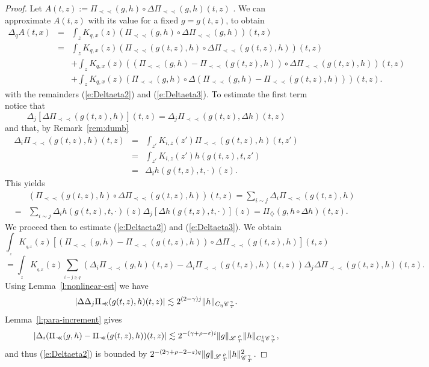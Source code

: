 \documentclass{amsart}
\newcommand{\assign}{:=}
\newcommand{\cdummy}{\cdot}
\newcommand{\precprec}{\prec\!\!\!\prec}
\theoremstyle{remark}
\theoremstyle{definition}
\newcommand{\CC}{\mathscr{C} \hspace{.1em}}
\newcommand{\LL}{\mathscr{L} \hspace{.2em}}
\begin{document}
\begin{proof}
  Let $A (t, z) \assign \Pi_{\precprec} (g, h) \circ \Delta \Pi_{\precprec}
  (g, h) (t, z)$ . We can approximate $A (t, z)$ with its value for a fixed $g
  = g (t, z)$, to obtain
  \begin{eqnarray}
    \Delta_q A (t, x) & = & \int_z K_{q, x} (z) (\Pi_{\precprec} (g, h) \circ
    \Delta \Pi_{\precprec} (g, h)) (t, z) \nonumber\\
    & = & \int_z K_{q, x} (z) (\Pi_{\precprec} (g (t, z), h) \circ \Delta
    \Pi_{\precprec} (g (t, z), h)) (t, z) \nonumber\\
    &  & + \int_z K_{q, x} (z) ((\Pi_{\precprec} (g, h) - \Pi_{\precprec} (g
    (t, z), h)) \circ \Delta \Pi_{\precprec} (g (t, z), h)) (t, z) 
    \label{e:Deltaeta2}\\
    &  & + \int_z K_{q, x} (z) (\Pi_{\precprec} (g, h) \circ \Delta
    (\Pi_{\precprec} (g, h) - \Pi_{\precprec} (g (t, z), h))) (t, z) . 
    \label{e:Deltaeta3}
  \end{eqnarray}
  with the remainders (\ref{e:Deltaeta2}) and (\ref{e:Deltaeta3}). To estimate
  the first term notice that
  \[ \Delta_j [\Delta \Pi_{\precprec} (g (t, z), h)] (t, z) = \Delta_j
     \Pi_{\precprec} (g (t, z), \Delta h) (t, z) \]
  and that, by Remark~\ref{rem:dumb}
  \begin{eqnarray*}
    \Delta_i \Pi_{\precprec} (g (t, z), h) (t, z) & = & \int_{z'} K_{i, z}
    (z') \Pi_{\precprec} (g (t, z), h) (t, z')\\
    & = & \int_{z'} K_{i, z} (z') h (g (t, z), t, z')\\
    & = & \Delta_i h (g (t, z), t, \cdummy) (z) .
  \end{eqnarray*}
  This yields
  \begin{eqnarray*}
    &  & (\Pi_{\precprec} (g (t, z), h) \circ \Delta \Pi_{\precprec} (g (t,
    z), h)) (t, z) = \sum_{i \sim j} \Delta_i \Pi_{\precprec} (g (t, z), h)\\
    & = & \sum_{i \sim j} \Delta_i h (g (t, z), t, \cdummy) (z) \Delta_j
    [\Delta h (g (t, z), t, \cdummy)] (z) = \Pi_{\diamondsuit} (g, h \circ
    \Delta h) (t, z) .
  \end{eqnarray*}
  We proceed then to estimate (\ref{e:Deltaeta2}) and (\ref{e:Deltaeta3}). We
  obtain
  \[ \int_{_z} K_{_{q, x}} (z) [(\Pi_{\precprec} (g, h) - \Pi_{\precprec} (g
     (t, z), h)) \circ \Delta \Pi_{\precprec} (g (t, z), h)] (t, z) \]
  \[ = \int_{_z} K_{_{q, x}} (z) \sum_{_{i \sim j \gtrsim q}} (\Delta_i
     \Pi_{\precprec} (g, h) (t, z) - \Delta_i \Pi_{\precprec} (g (t, z), h)
     (t, z)) \Delta_j \Delta \Pi_{\precprec} (g (t, z), h) (t, z) . \]
  Using Lemma~\ref{l:nonlinear-est} we have
  \[ | \Delta \Delta_j \Pi_{\precprec} (g (t, z), h) (t, z) | \lesssim 2^{(2 -
     \gamma) j} \| h \|_{C_{\eta} \CC^{\gamma}_T} . \]
  Lemma~\ref{l:para-increment} gives
  \[ | \Delta_i (\Pi_{\precprec} (g, h) - \Pi_{\precprec} (g (t, z), h)) (t,
     z) | \lesssim 2^{- (\gamma + \rho - \varepsilon) i} \| g
     \|_{\LL^{\rho}_T} \| h \|_{C_{\eta}^1 \CC^{\gamma}_{_T}}, \]
  and thus (\ref{e:Deltaeta2}) is bounded by $2^{- (2 \gamma + \rho - 2 -
  \varepsilon) q} \| g \|_{\LL^{\rho}_T} \| h \|^2_{\CC^{\gamma}_{_T}}$.
  

\end{proof}
\end{document}
